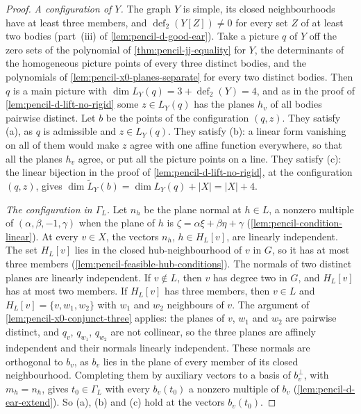 \begin{proof}
  \emph{A configuration of $Y$.} The graph $Y$ is simple, its closed
  neighbourhoods have at least three members, and
  $\operatorname{def}_2(Y[Z]) \ne 0$ for every set $Z$ of at least two
  bodies (part~(iii) of \cref{lem:pencil-d-good-ear}). Take a picture $q$
  of $Y$ off the zero sets of the polynomial of
  \cref{thm:pencil-jj-equality} for $Y$, the determinants of the
  homogeneous picture points of every three distinct bodies, and the
  polynomials of \cref{lem:pencil-x0-planes-separate} for every two
  distinct bodies. Then $q$ is a main picture with
  $\dim L_Y(q) = 3 + \operatorname{def}_2(Y) = 4$, and as in the proof of
  \cref{lem:pencil-d-lift-no-rigid} some $z \in L_Y(q)$ has the planes
  $h_v$ of all bodies pairwise distinct. Let $b$ be the points of the
  configuration $(q, z)$. They satisfy (a), as $q$ is admissible and
  $z \in L_Y(q)$. They satisfy (b): a linear form vanishing on all of them
  would make $z$ agree with one affine function everywhere, so that all
  the planes $h_v$ agree, or put all the picture points on a line. They
  satisfy (c): the linear bijection in the proof of
  \cref{lem:pencil-d-lift-no-rigid}, at the configuration $(q, z)$, gives
  $\dim \widetilde L_Y(b) = \dim L_Y(q) + |X| = |X| + 4$.

  \emph{The configuration in $\Gamma_L$.} Let $n_h$ be the plane normal at
  $h \in L$, a nonzero multiple of $(\alpha, \beta, -1, \gamma)$ when the
  plane of $h$ is $\zeta = \alpha \xi + \beta \eta + \gamma$
  (\cref{lem:pencil-condition-linear}). At every $v \in X$, the vectors
  $n_h$, $h \in H_L[v]$, are linearly independent. The set $H_L[v]$ lies
  in the closed hub-neighbourhood of $v$ in $G$, so it has at most three
  members (\cref{lem:pencil-feasible-hub-conditions}). The normals of two
  distinct planes are linearly independent. If $v \notin L$, then $v$ has
  degree two in $G$, and $H_L[v]$ has at most two members. If $H_L[v]$
  has three members, then $v \in L$ and $H_L[v] = \{v, w_1, w_2\}$ with
  $w_1$ and $w_2$ neighbours of $v$. The argument of
  \cref{lem:pencil-x0-conjunct-three} applies: the planes of $v$, $w_1$
  and $w_2$ are pairwise distinct, and $q_v$, $q_{w_1}$, $q_{w_2}$ are not
  collinear, so the three planes are affinely independent and their
  normals linearly independent. These normals are orthogonal to $b_v$, as
  $b_v$ lies in the plane of every member of its closed neighbourhood.
  Completing them by auxiliary vectors to a basis of $b_v^{\perp}$, with
  $m_h = n_h$, gives $t_0 \in \Gamma_L$ with every $b_v(t_0)$ a nonzero
  multiple of $b_v$ (\cref{lem:pencil-d-ear-extend}). So (a), (b) and (c)
  hold at the vectors $b_v(t_0)$.


\end{proof}
